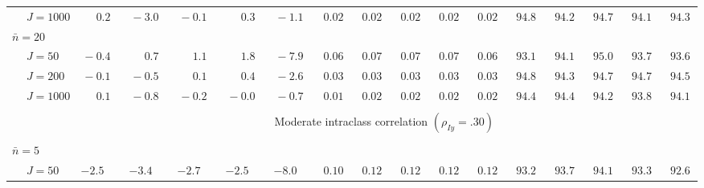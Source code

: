 \begin{sidewaystable}
\begin{threeparttable}
\begin{tabular}{llccccccccccccccc}
 & \nopagebreak $\;J=1000$  & $\phantom{0}\phantom{-}0.2\phantom{0}$ & $\phantom{0}{-}3.0\phantom{0}$ & $\phantom{0}{-}0.1\phantom{0}$ & $\phantom{0}\phantom{-}0.3\phantom{0}$ & $\phantom{0}{-}1.1\phantom{0}$ & $\phantom{0}0.02\phantom{0}$ & $\phantom{0}0.02\phantom{0}$ & $\phantom{0}0.02\phantom{0}$ & $\phantom{0}0.02\phantom{0}$ & $\phantom{0}0.02\phantom{0}$ & $\phantom{0}94.8\phantom{0}$ & $\phantom{0}94.2\phantom{0}$ & $\phantom{0}94.7\phantom{0}$ & $\phantom{0}94.1\phantom{0}$ & $\phantom{0}94.3\phantom{0}$ \\
\multicolumn{4}{l}{$\bar{n}=20$} \\  & \nopagebreak $\;J=50$  & $\phantom{0}{-}0.4\phantom{0}$ & $\phantom{0}\phantom{-}0.7\phantom{0}$ & $\phantom{0}\phantom{-}1.1\phantom{0}$ & $\phantom{0}\phantom{-}1.8\phantom{0}$ & $\phantom{0}{-}7.9\phantom{0}$ & $\phantom{0}0.06\phantom{0}$ & $\phantom{0}0.07\phantom{0}$ & $\phantom{0}0.07\phantom{0}$ & $\phantom{0}0.07\phantom{0}$ & $\phantom{0}0.06\phantom{0}$ & $\phantom{0}93.1\phantom{0}$ & $\phantom{0}94.1\phantom{0}$ & $\phantom{0}95.0\phantom{0}$ & $\phantom{0}93.7\phantom{0}$ & $\phantom{0}93.6\phantom{0}$ \\
 & \nopagebreak $\;J=200$  & $\phantom{0}{-}0.1\phantom{0}$ & $\phantom{0}{-}0.5\phantom{0}$ & $\phantom{0}\phantom{-}0.1\phantom{0}$ & $\phantom{0}\phantom{-}0.4\phantom{0}$ & $\phantom{0}{-}2.6\phantom{0}$ & $\phantom{0}0.03\phantom{0}$ & $\phantom{0}0.03\phantom{0}$ & $\phantom{0}0.03\phantom{0}$ & $\phantom{0}0.03\phantom{0}$ & $\phantom{0}0.03\phantom{0}$ & $\phantom{0}94.8\phantom{0}$ & $\phantom{0}94.3\phantom{0}$ & $\phantom{0}94.7\phantom{0}$ & $\phantom{0}94.7\phantom{0}$ & $\phantom{0}94.5\phantom{0}$ \\
 & \nopagebreak $\;J=1000$  & $\phantom{0}\phantom{-}0.1\phantom{0}$ & $\phantom{0}{-}0.8\phantom{0}$ & $\phantom{0}{-}0.2\phantom{0}$ & $\phantom{0}{-}0.0\phantom{0}$ & $\phantom{0}{-}0.7\phantom{0}$ & $\phantom{0}0.01\phantom{0}$ & $\phantom{0}0.02\phantom{0}$ & $\phantom{0}0.02\phantom{0}$ & $\phantom{0}0.02\phantom{0}$ & $\phantom{0}0.02\phantom{0}$ & $\phantom{0}94.4\phantom{0}$ & $\phantom{0}94.4\phantom{0}$ & $\phantom{0}94.2\phantom{0}$ & $\phantom{0}93.8\phantom{0}$ & $\phantom{0}94.1\phantom{0}$ \\
[0.5ex]\hline\\[-1.6ex] 
& & \multicolumn{15}{c}{Moderate intraclass correlation $(\rho_{Iy}=.30)$} \\[0.6ex]\hline\\[-1.8ex]
\multicolumn{4}{l}{$\bar{n}=5$} \\  & \nopagebreak $\;J=50$  & ${-}2.5\phantom{0}$ & ${-}3.4\phantom{0}$ & ${-}2.7\phantom{0}$ & ${-}2.5\phantom{0}$ & ${-}8.0\phantom{0}$ & $\phantom{0}0.10\phantom{0}$ & $\phantom{0}0.12\phantom{0}$ & $\phantom{0}0.12\phantom{0}$ & $\phantom{0}0.12\phantom{0}$ & $\phantom{0}0.12\phantom{0}$ & $\phantom{0}93.2\phantom{0}$ & $\phantom{0}93.7\phantom{0}$ & $\phantom{0}94.1\phantom{0}$ & $\phantom{0}93.3\phantom{0}$ & $\phantom{0}92.6\phantom{0}$ \\

\end{tabular}
\end{threeparttable}
\end{sidewaystable}
